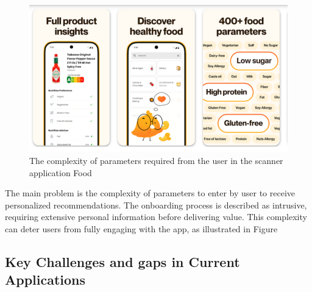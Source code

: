 \begin{figure}[H]
\centering
\includegraphics[scale=0.35]{images/food_check.png}
\caption{The complexity of parameters required from the user in the scanner application Food}
\label{fig:foofCheck}
\end{figure}

The main problem is the complexity of parameters to enter by user
to receive personalized recommendations. The onboarding process is
described as intrusive, requiring extensive personal information before
delivering value. This complexity can deter users from fully engaging
with the app, as illustrated in Figure

\subsection{Key Challenges and gaps in Current Applications}

